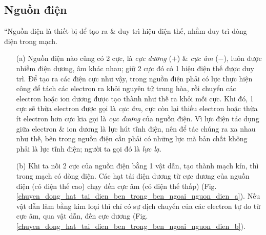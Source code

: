 \documentclass[oneside]{book}
\numberwithin{equation}{section}
\begin{document}
\subsection{Nguồn điện}
``Nguồn điện là thiết bị để tạo ra \& duy trì hiệu điện thế, nhằm duy trì dòng điện trong mạch.
\begin{itemize}
	\item[(a)] Nguồn điện nào cũng có 2 cực, là \textit{cực dương} ($+$) \& \textit{cực âm} ($-$), luôn được nhiễm điện dương, âm khác nhau; giữ 2 cực đó có 1 hiệu điện thế được duy trì. Để tạo ra các điện cực như vậy, trong nguồn điện phải có lực thực hiện công để tách các electron ra khỏi nguyên tử trung hòa, rồi chuyển các electron hoặc ion dương được tạo thành như thế ra khỏi mỗi cực. Khi đó, 1 cực sẽ thừa electron được gọi là \textit{cực âm}, cực còn lại thiếu electron hoặc thừa ít electron hơn cực kia gọi là \textit{cực dương} của nguồn điện. Vì lực điện tác dụng giữa electron \& ion dương là lực hút tĩnh điện, nên để tác chúng ra xa nhau như thế, bên trong nguồn điện cần phải có những lực mà bản chất không phải là lực tĩnh điện; người ta gọi đó là \textit{lực lạ}.
	\item[(b)] Khi ta nối 2 cực của nguồn điện bằng 1 vật dẫn, tạo thành mạch kín, thì trong mạch có dòng điện. Các hạt tải điện dương từ cực dương của nguồn điện (có điện thế cao) chạy đến cực âm (có điện thế thấp) (Fig. \ref{chuyen_dong_hat_tai_dien_ben_trong_ben_ngoai_nguon_dien_a}). Nếu vật dẫn làm bằng kim loại thì chỉ có sự dịch chuyển của các electron tự do từ cực âm, qua vật dẫn, đến cực dương (Fig. \ref{chuyen_dong_hat_tai_dien_ben_trong_ben_ngoai_nguon_dien_b}).
	

\end{itemize}
\end{document}
